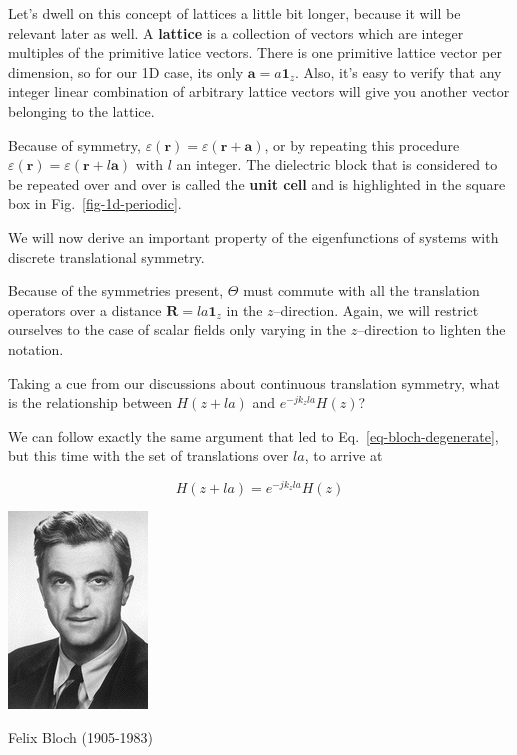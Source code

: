 Let's dwell on this concept of lattices a little bit longer, because it will be relevant later as well. A \textbf{lattice} is a collection of vectors which are integer multiples of the primitive latice vectors. There is one primitive lattice vector per dimension, so for our 1D case, its only  ${\mathbf a} = a {\mathbf 1}_z$. Also, it's easy to verify that any integer linear combination of arbitrary lattice vectors will give you another vector belonging to the lattice.

Because of symmetry, $\varepsilon({\mathbf r}) =  \varepsilon({\mathbf r} + {\mathbf a})$, or by repeating this procedure $\varepsilon({\mathbf r}) =  \varepsilon({\mathbf r} + l {\mathbf a})$ with $l$ an integer. The dielectric block that is considered to be repeated over and over is called the \textbf{unit cell} and is highlighted in the square box in Fig.~\ref{fig-1d-periodic}. 


We will now derive an important property of the eigenfunctions of systems with discrete translational symmetry.

Because of the symmetries present, $\Theta$ must commute with all the translation operators over a distance ${\mathbf R} = l a {\mathbf 1}_z$ in the $z$--direction. Again, we will restrict ourselves to the case of scalar fields only varying in the $z$--direction to lighten the notation.

\begin{cue}
Taking a cue from our discussions about continuous translation symmetry, what is the relationship between $H(z + la)$ and $e^{-j k_z la} H(z)$?
\end{cue}

We can follow exactly the same argument that led to Eq.~\ref{eq-bloch-degenerate}, but this time with the set of translations over $la$, to arrive at

\begin{equation}
H(z + la) = e^{-j k_z la} H(z)
\end{equation} 


\begin{marginfigure}[0.5cm]
  \includegraphics{symmetry/figures/bloch}
  \caption{Felix Bloch (1905-1983)}
\end{marginfigure}

